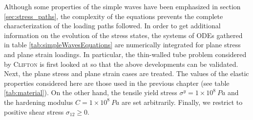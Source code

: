 Although some properties of the simple waves have been emphasized in section \ref{sec:stress_paths}, the complexity of the equations prevents the complete characterization of the loading paths followed.
In order to get additional information on the evolution of the stress states, the systems of ODEs gathered in table \ref{tab:simpleWavesEquations} are numerically integrated for plane stress and plane strain loadings. %
In particular, the thin-walled tube problem considered by \textsc{Clifton} \cite{Clifton} is first looked at so that the above developments can be validated.
Next, the plane stress and plane strain cases are treated.
The values of the elastic properties considered here are those used in the previous chapter (see table \ref{tab:material}).
On the other hand, the tensile yield stress $\sigma^y=1 \times 10^{8} \: Pa$ and the hardening modulus $C=1\times10^8 \: Pa$ are set arbitrarily.
Finally, we restrict to positive shear stress $\sigma_{12}\geq 0$.

